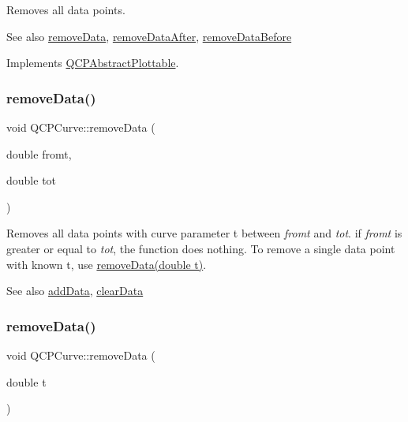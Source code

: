 Removes all data points. \begin{DoxySeeAlso}{See also}
\hyperlink{class_q_c_p_curve_ad45bb5479be799163028ef2b776f7221}{remove\+Data}, \hyperlink{class_q_c_p_curve_a0365cb947c4e6d405ee22e00191d5f52}{remove\+Data\+After}, \hyperlink{class_q_c_p_curve_af6f4284fbc2f34e676f24dce03c34fe5}{remove\+Data\+Before} 
\end{DoxySeeAlso}


Implements \hyperlink{class_q_c_p_abstract_plottable_a86e5b8fd4b6ff4f4084e7ea4c573fc53}{Q\+C\+P\+Abstract\+Plottable}.

\hypertarget{class_q_c_p_curve_ad45bb5479be799163028ef2b776f7221}{}\label{class_q_c_p_curve_ad45bb5479be799163028ef2b776f7221} 
\subsubsection{\texorpdfstring{remove\+Data()}{removeData()}\hspace{0.1cm}{\footnotesize\ttfamily [1/2]}}
{\footnotesize\ttfamily void Q\+C\+P\+Curve\+::remove\+Data (\begin{DoxyParamCaption}\item[{double}]{fromt,  }\item[{double}]{tot }\end{DoxyParamCaption})}

Removes all data points with curve parameter t between {\itshape fromt} and {\itshape tot}. if {\itshape fromt} is greater or equal to {\itshape tot}, the function does nothing. To remove a single data point with known t, use \hyperlink{class_q_c_p_curve_a30c91acfa591ec534c49fed4c0fca39a}{remove\+Data(double t)}.

\begin{DoxySeeAlso}{See also}
\hyperlink{class_q_c_p_curve_a4e24023c3b9ac75440c7a260172c99af}{add\+Data}, \hyperlink{class_q_c_p_curve_ae0462c61dbfbac07db0736ec64110241}{clear\+Data} 
\end{DoxySeeAlso}
\hypertarget{class_q_c_p_curve_a30c91acfa591ec534c49fed4c0fca39a}{}\label{class_q_c_p_curve_a30c91acfa591ec534c49fed4c0fca39a} 
\subsubsection{\texorpdfstring{remove\+Data()}{removeData()}\hspace{0.1cm}{\footnotesize\ttfamily [2/2]}}
{\footnotesize\ttfamily void Q\+C\+P\+Curve\+::remove\+Data (\begin{DoxyParamCaption}\item[{double}]{t }\end{DoxyParamCaption})}

